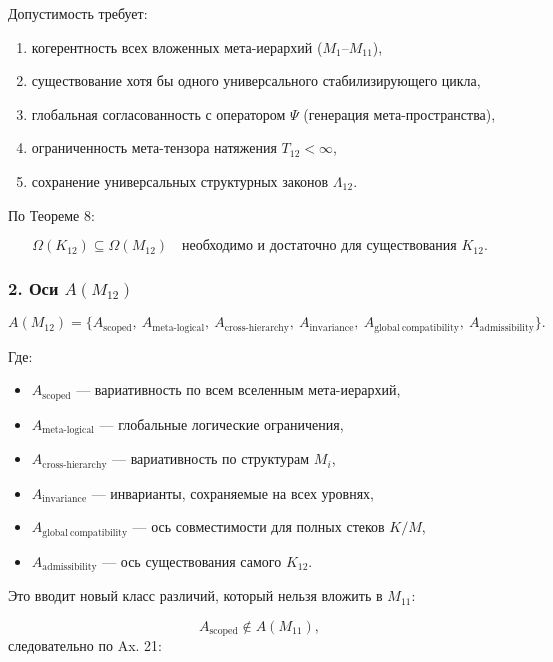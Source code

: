 Допустимость требует:

\begin{enumerate}
    \item когерентность всех вложенных мета-иерархий (\(M_1\)–\(M_{11}\)),
    \item существование хотя бы одного универсального стабилизирующего цикла,
    \item глобальная согласованность с оператором $\Psi$ (генерация мета-пространства),
    \item ограниченность мета-тензора натяжения $T_{12}<\infty$,
    \item сохранение универсальных структурных законов $\Lambda_{12}$.
\end{enumerate}

По Теореме 8:

\[
\Omega(K_{12}) \subseteq \Omega(M_{12})
\quad \text{необходимо и достаточно для существования }K_{12}.
\]

\subsubsection*{2. Оси $A(M_{12})$}

\[
A(M_{12}) =
\{
A_{\mathrm{scoped}},\
A_{\mathrm{meta\mbox{-}logical}},\
A_{\mathrm{cross\mbox{-}hierarchy}},\
A_{\mathrm{invariance}},\
A_{\mathrm{global\ compatibility}},\
A_{\mathrm{admissibility}}
\}.
\]

Где:

\begin{itemize}
    \item $A_{\mathrm{scoped}}$ — вариативность по всем вселенным мета-иерархий,
    \item $A_{\mathrm{meta\mbox{-}logical}}$ — глобальные логические ограничения,
    \item $A_{\mathrm{cross\mbox{-}hierarchy}}$ — вариативность по структурам $M_i$,
    \item $A_{\mathrm{invariance}}$ — инварианты, сохраняемые на всех уровнях,
    \item $A_{\mathrm{global\ compatibility}}$ — ось совместимости для полных стеков $K/M$,
    \item $A_{\mathrm{admissibility}}$ — ось существования самого $K_{12}$.
\end{itemize}

Это вводит новый класс различий, который нельзя вложить в $M_{11}$:

\[
A_{\mathrm{scoped}}\notin A(M_{11}),
\]
следовательно по Ax. 21:

